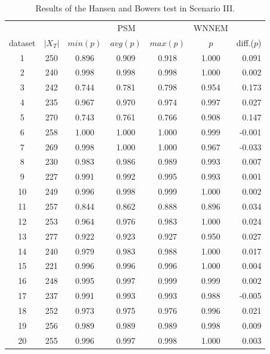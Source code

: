 		\begin{table}[h]
			\caption{Results of the Hansen and Bowers test in Scenario III. %
			}
			\label{tab:wnnem_scen_III_stat_separated}
			\centering
			\begin{tabular}{ccccccr} 
				\toprule
				& & \multicolumn{3}{c}{PSM}
				& WNNEM & \\
				dataset & $|X_T|$ & $min (p)$ & $avg (p)$ & $max (p)$ & $p$   & diff.($p$) \\
				\midrule
				1       & 250     & 0.896     & 0.909     & 0.918     & 1.000 & 0.091      \\
				2       & 240     & 0.998     & 0.998     & 0.998     & 1.000 & 0.002      \\
				3       & 242     & 0.744     & 0.781     & 0.798     & 0.954 & 0.173      \\
				4       & 235     & 0.967     & 0.970     & 0.974     & 0.997 & 0.027      \\
				5       & 270     & 0.743     & 0.761     & 0.766     & 0.908 & 0.147      \\
				6       & 258     & 1.000     & 1.000     & 1.000     & 0.999 & -0.001     \\
				7       & 269     & 0.998     & 1.000     & 1.000     & 0.967 & -0.033     \\
				8       & 230     & 0.983     & 0.986     & 0.989     & 0.993 & 0.007      \\
				9       & 227     & 0.991     & 0.992     & 0.995     & 0.993 & 0.001      \\
				10      & 249     & 0.996     & 0.998     & 0.999     & 1.000 & 0.002      \\
				11      & 257     & 0.844     & 0.862     & 0.888     & 0.896 & 0.034      \\
				12      & 253     & 0.964     & 0.976     & 0.983     & 1.000 & 0.024      \\
				13      & 277     & 0.922     & 0.923     & 0.927     & 0.950 & 0.027      \\
				14      & 240     & 0.979     & 0.983     & 0.988     & 1.000 & 0.017      \\
				15      & 221     & 0.996     & 0.996     & 0.996     & 1.000 & 0.004      \\
				16      & 248     & 0.995     & 0.997     & 0.999     & 0.999 & 0.002      \\
				17      & 237     & 0.991     & 0.993     & 0.993     & 0.988 & -0.005     \\
				18      & 252     & 0.973     & 0.975     & 0.976     & 0.996 & 0.021      \\
				19      & 256     & 0.989     & 0.989     & 0.989     & 0.998 & 0.009      \\
				20      & 255     & 0.996     & 0.997     & 0.998     & 1.000 & 0.003      \\
																				

\end{tabular}
\end{table}
